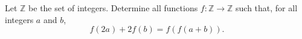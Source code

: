 Let $\mathbb{Z}$ be the set of integers. Determine all functions $f:\mathbb{Z}\to\mathbb{Z}$ such that, for all integers $a$ and $b$, \[f(2a)+2f(b)=f(f(a+b)).\]